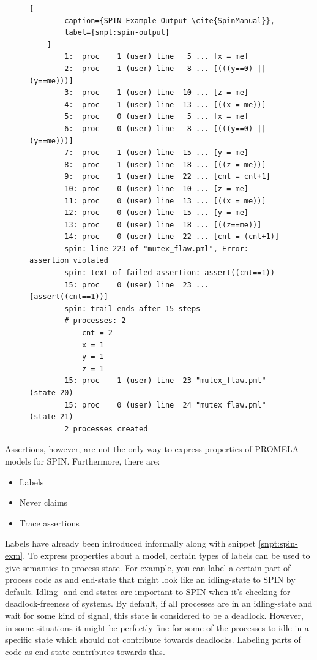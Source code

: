 \begin{figure}
    \begin{lstlisting}[
        caption={SPIN Example Output \cite{SpinManual}},
        label={snpt:spin-output}
    ]
        1:  proc    1 (user) line   5 ... [x = me]
        2:  proc    1 (user) line   8 ... [(((y==0) || (y==me)))]
        3:  proc    1 (user) line  10 ... [z = me]
        4:  proc    1 (user) line  13 ... [((x = me))]
        5:  proc    0 (user) line   5 ... [x = me]
        6:  proc    0 (user) line   8 ... [(((y==0) || (y==me)))]
        7:  proc    1 (user) line  15 ... [y = me]
        8:  proc    1 (user) line  18 ... [((z = me))]
        9:  proc    1 (user) line  22 ... [cnt = cnt+1]
        10: proc    0 (user) line  10 ... [z = me]
        11: proc    0 (user) line  13 ... [((x = me))]
        12: proc    0 (user) line  15 ... [y = me]
        13: proc    0 (user) line  18 ... [((z==me))]
        14: proc    0 (user) line  22 ... [cnt = (cnt+1)]
        spin: line 223 of "mutex_flaw.pml", Error: assertion violated
        spin: text of failed assertion: assert((cnt==1))
        15: proc    0 (user) line  23 ... [assert((cnt==1))]
        spin: trail ends after 15 steps
        # processes: 2
            cnt = 2
            x = 1
            y = 1
            z = 1
        15: proc    1 (user) line  23 "mutex_flaw.pml" (state 20)
        15: proc    0 (user) line  24 "mutex_flaw.pml" (state 21)
        2 processes created
    \end{lstlisting}
\end{figure}

Assertions, however, are not the only way to express properties of PROMELA models for SPIN.
Furthermore, there are:
\begin{itemize}
    \item Labels
    \item Never claims
    \item Trace assertions
\end{itemize}

Labels have already been introduced informally along with snippet \ref{snpt:spin-exm}.
To express properties about a model, certain types of labels can be used to give semantics to process state.
For example, you can label a certain part of process code as and end-state that might look like an idling-state to SPIN by default.
Idling- and end-states are important to SPIN when it's checking for deadlock-freeness of systems.
By default, if all processes are in an idling-state and wait for some kind of signal, this state is considered to be a deadlock.
However, in some situations it might be perfectly fine for some of the processes to idle in a specific state which should not contribute towards deadlocks.
Labeling parts of code as end-state contributes towards this.

